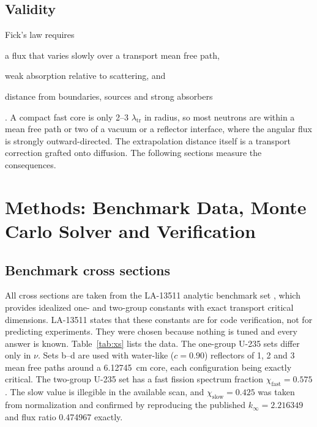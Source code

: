\documentclass[11pt,letterpaper]{article}
\newcommand{\kinf}{k_\infty}
\newcommand{\ltr}{\lambda_\mathrm{tr}}
\begin{document}
\subsection{Validity}
Fick's law requires
\begin{enumerate*}[label=(\roman*)]
  \item a flux that varies slowly over a transport mean free path,
  \item weak absorption relative to scattering, and
  \item distance from boundaries, sources and strong absorbers
\end{enumerate*}
\citep{Duderstadt1976,Stacey2018}. A compact fast core is only 2--3 $\ltr$ in radius, so most neutrons are within a mean free path or two of a vacuum or a reflector interface, where the angular flux is strongly outward-directed. The extrapolation distance itself is a transport correction grafted onto diffusion. The following sections measure the consequences.

\section{Methods: Benchmark Data, Monte Carlo Solver and Verification}
\label{sec:methods}

\subsection{Benchmark cross sections}
All cross sections are taken from the LA-13511 analytic benchmark set \citep{Sood1999,Sood2003}, which provides idealized one- and two-group constants with exact transport critical dimensions. LA-13511 states that these constants are for code verification, not for predicting experiments. They were chosen because nothing is tuned and every answer is known. Table~\ref{tab:xs} lists the data. The one-group U-235 sets differ only in $\nu$. Sets b--d are used with water-like ($c = 0.90$) reflectors of 1, 2 and 3 mean free paths around a \SI{6.12745}{cm} core, each configuration being exactly critical. The two-group U-235 set has a fast fission spectrum fraction $\chi_\mathrm{fast} = 0.575$. The slow value is illegible in the available scan, and $\chi_\mathrm{slow} = 0.425$ was taken from normalization and confirmed by reproducing the published $\kinf = 2.216349$ and flux ratio 0.474967 exactly.
\end{document}
